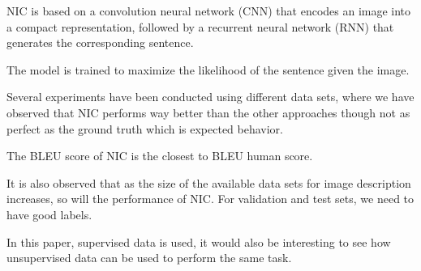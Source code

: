 \documentclass[a4paper,UKenglish,cleveref, autoref, thm-restate]{lipics-v2021}
\begin{document}
NIC is based on a convolution neural network (CNN) that encodes an image into a compact representation, followed by a recurrent neural network (RNN) that generates the corresponding sentence.

The model is trained to maximize the likelihood of the sentence given the image.

Several experiments have been conducted using different data sets, where we have observed that NIC performs way better than the other approaches though not as perfect as the ground truth which is expected behavior.

The BLEU score of NIC is the closest to BLEU human score.

It is also observed that as the size of the available data sets for image description increases, so will the performance of NIC. For validation and test sets, we need to have good labels.

In this paper, supervised data is used, it would also be interesting to see how unsupervised data can be used to perform the same task.
















\appendix
\end{document}
